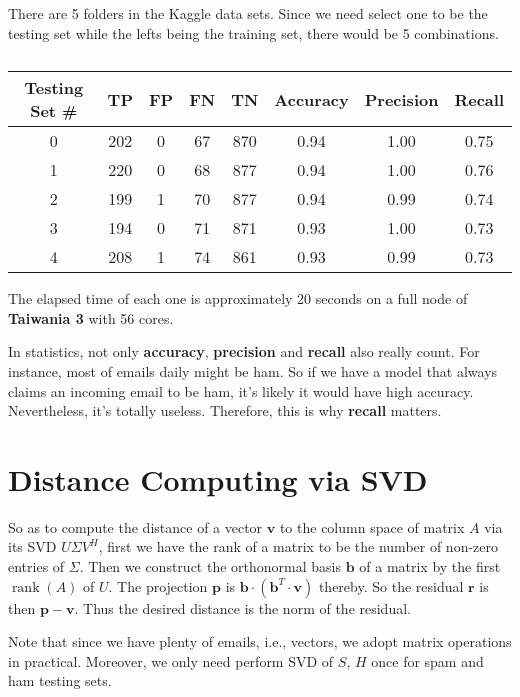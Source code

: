 \documentclass[12pt, a4paper]{article}
\begin{document}
There are 5 folders in the Kaggle data sets. Since we need select one to be the testing set while the lefts being the training set, there would be 5 combinations.

\begin{table}[htp]
\centering
\caption{}
\begin{tabular}{c|cccc|ccc}
\toprule
Testing Set \# & TP & FP & FN & TN & Accuracy & Precision & Recall \\
\midrule
0 & 202 & 0 & 67 & 870 & 0.94 & 1.00 & 0.75 \\
1 & 220 & 0 & 68 & 877 & 0.94 & 1.00 & 0.76 \\
2 & 199 & 1 & 70 & 877 & 0.94 & 0.99 & 0.74 \\
3 & 194 & 0 & 71 & 871 & 0.93 & 1.00 & 0.73 \\
4 & 208 & 1 & 74 & 861 & 0.93 & 0.99 & 0.73 \\
\bottomrule
\end{tabular}
\label{tab:q3}
\end{table}

The elapsed time of each one is approximately 20 seconds on a full node of \textbf{Taiwania 3} with 56 cores.

In statistics, not only \textbf{accuracy}, \textbf{precision} and \textbf{recall} also really count. For instance, most of emails daily might be ham. So if we have a model that always claims an incoming email to be ham, it's likely it would have high accuracy. Nevertheless, it's totally useless. Therefore, this is why \textbf{recall} matters.

\section{Distance Computing via SVD}

So as to compute the distance of a vector $\mathbf{v}$ to the column space of matrix $A$ via its SVD $U\Sigma V^H$, first we have the rank of a matrix to be the number of non-zero entries of $\Sigma$. Then we construct the orthonormal basis $\mathbf{b}$ of a matrix by the first $\operatorname{rank}(A)$ of $U$. The projection $\mathbf{p}$ is $\mathbf{b}\cdot(\mathbf{b}^T\cdot\mathbf{v})$ thereby. So the residual $\mathbf{r}$ is then $\mathbf{p}-\mathbf{v}$. Thus the desired distance is the norm of the residual.

Note that since we have plenty of emails, i.e., vectors, we adopt matrix operations in practical. Moreover, we only need perform SVD of $S$, $H$ once for spam and ham testing sets.
\end{document}
